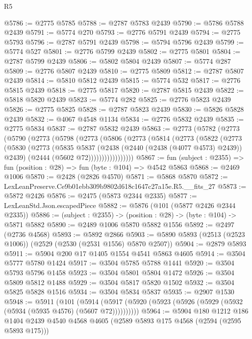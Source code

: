 \begin{lexlean}{R5}
\begin{coremodule}
@5786 := @2775 @5785
@5788 := @2787 @5783 @2439
@5790 := @5786 @5788 @2439
@5791 := @5774 @270
@5793 := @2776 @5791 @2439
@5794 := @2775 @5793
@5796 := @2787 @5791 @2439
@5798 := @5794 @5796 @2439
@5799 := @5774 @527
@5801 := @2776 @5799 @2439
@5802 := @2775 @5801
@5804 := @2787 @5799 @2439
@5806 := @5802 @5804 @2439
@5807 := @5774 @287
@5809 := @2776 @5807 @2439
@5810 := @2775 @5809
@5812 := @2787 @5807 @2439
@5814 := @5810 @5812 @2439
@5815 := @5774 @532
@5817 := @2776 @5815 @2439
@5818 := @2775 @5817
@5820 := @2787 @5815 @2439
@5822 := @5818 @5820 @2439
@5823 := @5774 @282
@5825 := @2776 @5823 @2439
@5826 := @2775 @5825
@5828 := @2787 @5823 @2439
@5830 := @5826 @5828 @2439
@5832 := @4067 @4548 @1134
@5834 := @2776 @5832 @2439
@5835 := @2775 @5834
@5837 := @2787 @5832 @2439
@5863 := @2773
    (@5782
      (@2773
        (@5790
          (@2773
            (@5798
              (@2773
                (@5806
                  (@2773
                    (@5814
                      (@2773
                        (@5822
                          (@2773
                            (@5830
                              (@2773
                                (@5835
                                  @5837
                                  (@2438 (@2440 (@2438 (@4077 @4573) @2439)) @2439)
                                  (@2444 (@5602 @72)))))))))))))))))
@5867 := fun (subject : @2355) => fun (position : @28) => fun (byte : @104) => @4542 @5863
@5868 := @2469 @1006
@5870 := @2428 (@2826 @4570)
@5871 := @5868 @5870
@5872 := LexLeanPreserve.Ce9b01ebb309b9802d618c1647c27a15e.R5.__fits_27
@5873 := @5872 @2426
@5876 := @2475 (@5873 @2344 @2335)
@5877 := LexLeanStd.Json.escapedPiece
@5882 := @5876 (@101 (@5877 @2426 @2344 @2335))
@5886 := (subject : @2355) -> (position : @28) -> (byte : @104) -> @5871 @5882
@5890 := @2489 @1006 @5870 @5882 @1556
@5892 := @2497 (@2736 @4568)
@5893 := @5892 @2866
@5903 := @5890 @5893 (@2513 (@2523 @1006)) (@2529 (@2530 (@2531 @1556) @5870 @2507))
@5904 := @2879 @5893
@5911 := @5904 @200 @17 @1405 @1554 @4541 @5863 @4605
@5914 := @3504 @5777 @5780 @1424
@5917 := @3504 @5785 @5788 @1441
@5920 := @3504 @5793 @5796 @1458
@5923 := @3504 @5801 @5804 @1472
@5926 := @3504 @5809 @5812 @1488
@5929 := @3504 @5817 @5820 @1502
@5932 := @3504 @5825 @5828 @1516
@5934 := @3504 @5834 @5837
@5935 := @2907 @1530
@5948 := @5911
    (@101 (@5914 (@5917 (@5920 (@5923 (@5926 (@5929 (@5932 (@5934 (@5935 @4576) (@5607 @72))))))))))
@5964 := @5904
    @180
    @1212
    @186
    @1404
    @2439
    @4540
    @4568
    @4605
    (@2589 @5893 @175 @4568 (@2594 (@2595 @5893 @175)))

\end{coremodule}
\end{lexlean}
